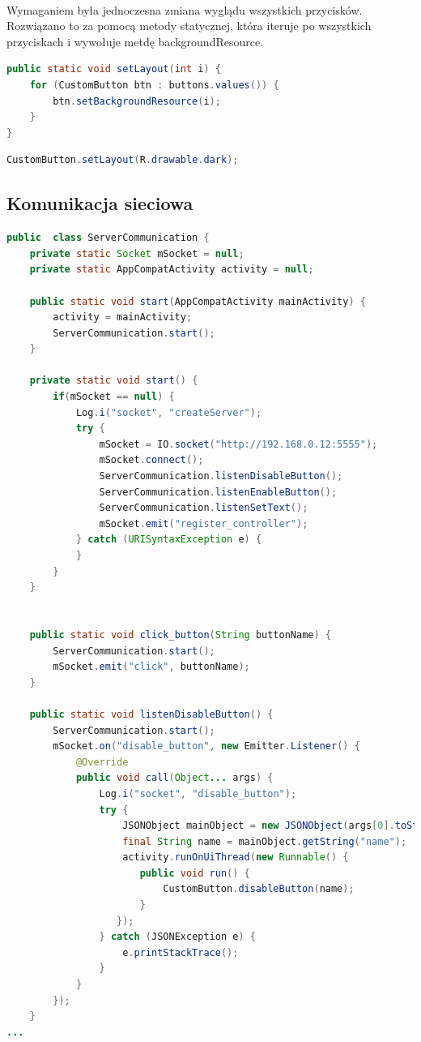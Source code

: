 \paragraph{}
Wymaganiem była jednoczesna zmiana wyglądu wszystkich przycisków. Rozwiązano to za pomocą metody statycznej, która iteruje po wszystkich przyciskach i wywołuje metdę backgroundResource.


\begin{lstlisting}[language=Java]
 public static void setLayout(int i) {
    for (CustomButton btn : buttons.values()) {
        btn.setBackgroundResource(i);
    }
}
\end{lstlisting}


\begin{lstlisting}[language=Java]
CustomButton.setLayout(R.drawable.dark);
\end{lstlisting}


\subsection{Komunikacja sieciowa}

\begin{lstlisting}[language=Java]
public  class ServerCommunication {
    private static Socket mSocket = null;
    private static AppCompatActivity activity = null;

    public static void start(AppCompatActivity mainActivity) {
        activity = mainActivity;
        ServerCommunication.start();
    }

    private static void start() {
        if(mSocket == null) {
            Log.i("socket", "createServer");
            try {
                mSocket = IO.socket("http://192.168.0.12:5555");
                mSocket.connect();
                ServerCommunication.listenDisableButton();
                ServerCommunication.listenEnableButton();
                ServerCommunication.listenSetText();
                mSocket.emit("register_controller");
            } catch (URISyntaxException e) {
            }
        }
    }


    public static void click_button(String buttonName) {
        ServerCommunication.start();
        mSocket.emit("click", buttonName);
    }

    public static void listenDisableButton() {
        ServerCommunication.start();
        mSocket.on("disable_button", new Emitter.Listener() {
            @Override
            public void call(Object... args) {
                Log.i("socket", "disable_button");
                try {
                    JSONObject mainObject = new JSONObject(args[0].toString());
                    final String name = mainObject.getString("name");
                    activity.runOnUiThread(new Runnable() {
                       public void run() {
                           CustomButton.disableButton(name);
                       }
                   });
                } catch (JSONException e) {
                    e.printStackTrace();
                }
            }
        });
    }
...
\end{lstlisting}
